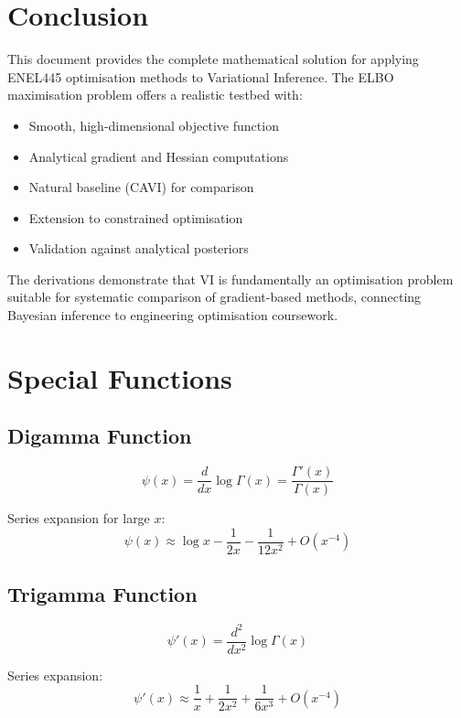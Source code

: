 \documentclass[11pt]{article}
\begin{document}
\section{Conclusion}

This document provides the complete mathematical solution for applying ENEL445 optimisation methods to Variational Inference. The ELBO maximisation problem offers a realistic testbed with:
\begin{itemize}
\item Smooth, high-dimensional objective function
\item Analytical gradient and Hessian computations
\item Natural baseline (CAVI) for comparison
\item Extension to constrained optimisation
\item Validation against analytical posteriors
\end{itemize}

The derivations demonstrate that VI is fundamentally an optimisation problem suitable for systematic comparison of gradient-based methods, connecting Bayesian inference to engineering optimisation coursework.

\appendix

\section{Special Functions}

\subsection{Digamma Function}
\begin{equation}
\psi(x) = \frac{d}{dx}\log \Gamma(x) = \frac{\Gamma'(x)}{\Gamma(x)}
\end{equation}

Series expansion for large $x$:
\begin{equation}
\psi(x) \approx \log x - \frac{1}{2x} - \frac{1}{12x^2} + O(x^{-4})
\end{equation}

\subsection{Trigamma Function}
\begin{equation}
\psi'(x) = \frac{d^2}{dx^2}\log \Gamma(x)
\end{equation}

Series expansion:
\begin{equation}
\psi'(x) \approx \frac{1}{x} + \frac{1}{2x^2} + \frac{1}{6x^3} + O(x^{-4})
\end{equation}
\end{document}
